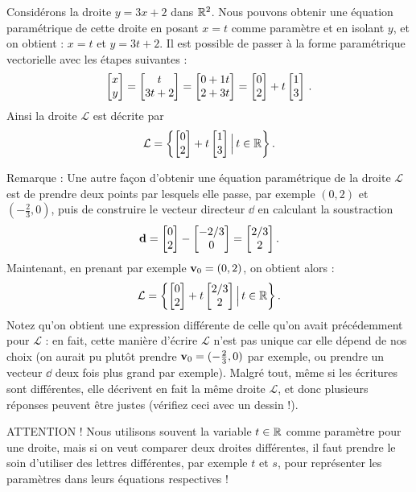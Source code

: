 \begin{myexample}
Considérons la droite $y=3x+2$ dans $\mathbb{R}^2$.  Nous pouvons obtenir une équation paramétrique de cette droite en posant $x=t$ comme paramètre et en isolant $y$, et on obtient : 
$x = t$ et $y=3t+2$.  Il est possible de passer à la forme paramétrique vectorielle avec les étapes suivantes :
$$
\left[ \begin{matrix} x\\y \end{matrix} \right] = \left[ \begin{matrix} t\\3t+2 \end{matrix} \right] = \left[ \begin{matrix} 0+1t\\2+3t \end{matrix} \right] = \left[ \begin{matrix} 0\\2 \end{matrix} \right] + t\left[ \begin{matrix} 1\\3 \end{matrix} \right]\,.
$$
Ainsi la droite $\mathcal L$ est décrite par
$$
\mathcal L = \left\{ \left[ \begin{matrix} 0\\2 \end{matrix} \right] + t\left[ \begin{matrix} 1\\3 \end{matrix} \right] \Big| \, t \in \mathbb{R}\right\}.
$$


Remarque : Une autre façon d'obtenir une équation paramétrique de la droite $\mathcal L$ est de prendre deux
points par lesquels elle passe, par exemple $(0,2)$ et $(-\frac{2}{3},0)$, puis de construire le vecteur directeur $\dd$ en calculant la soustraction
$$\mathbf{d} = \left[ \begin{matrix} 0\\2 \end{matrix} \right]-\left[ \begin{matrix} -2/3\\0 \end{matrix} \right] = \left[ \begin{matrix} 2/3\\2 \end{matrix} \right].$$
Maintenant, en prenant par exemple $\mathbf{v}_0 = (0,2)$, on obtient alors :
$$
\mathcal L = \left\{ \left[ \begin{matrix} 0\\2 \end{matrix} \right] + t\left[ \begin{matrix} 2/3\\2 \end{matrix} \right] \Big|\, t\in\mathbb{R}\right\}.
$$
Notez qu'on obtient une expression différente de celle qu'on avait précédemment pour $\mathcal L$ : en fait, cette manière d'écrire $\mathcal L$ n'est pas unique car elle dépend de nos choix (on aurait pu plutôt prendre $\mathbf{v}_0 = (-\frac{2}{3},0)$ par exemple, ou prendre un vecteur $\dd$ deux fois plus grand par exemple). Malgré tout, même si les écritures sont différentes, elle décrivent en fait la même droite $\mathcal L$, et donc plusieurs réponses peuvent être justes (vérifiez ceci avec un dessin !).
\end{myexample}

ATTENTION !  Nous utilisons souvent la variable $t\in\mathbb{R}$ comme paramètre pour une droite, mais si
on veut comparer deux droites différentes, il faut prendre le soin d'utiliser des
lettres différentes, par exemple $t$ et $s$, pour représenter les paramètres dans leurs équations respectives !


